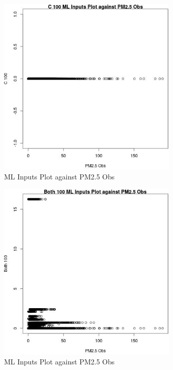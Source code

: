 \begin{figure} 
\centering  
\includegraphics[width=0.77\textwidth]{Code_Outputs/Report_ML_input_PM25_Step4_part_e_de_duplicated_aves_C_100vPM25_Obs.jpg} 
\caption{\label{fig:Report_ML_input_PM25_Step4_part_e_de_duplicated_avesC_100vPM25_Obs}ML Inputs Plot against PM2.5 Obs} 
\end{figure} 
 

\begin{figure} 
\centering  
\includegraphics[width=0.77\textwidth]{Code_Outputs/Report_ML_input_PM25_Step4_part_e_de_duplicated_aves_Both_100vPM25_Obs.jpg} 
\caption{\label{fig:Report_ML_input_PM25_Step4_part_e_de_duplicated_avesBoth_100vPM25_Obs}ML Inputs Plot against PM2.5 Obs} 
\end{figure} 
 

